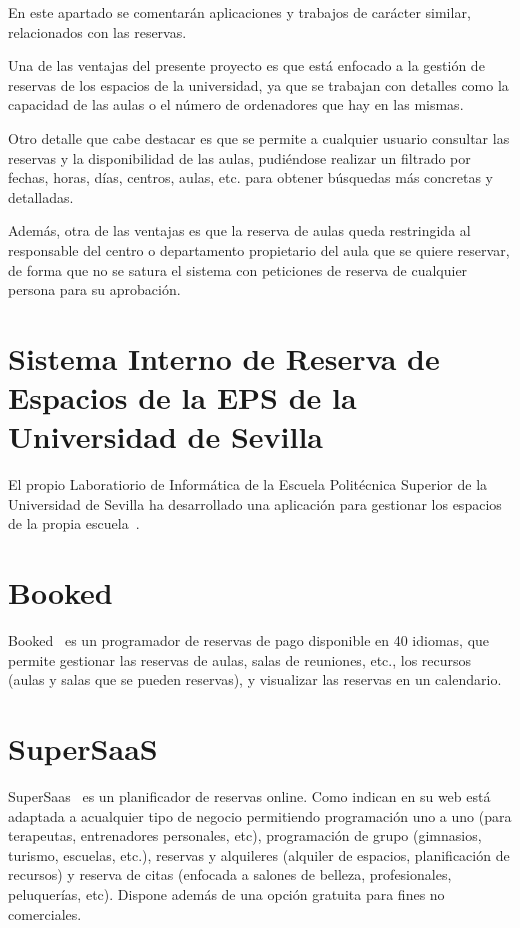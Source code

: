 En este apartado se comentarán aplicaciones y trabajos de carácter similar, relacionados con las reservas.

Una de las ventajas del presente proyecto es que está enfocado a la gestión de reservas de los espacios de la universidad, ya que se trabajan con detalles como la capacidad de las aulas o el número de ordenadores que hay en las mismas.

Otro detalle que cabe destacar es que se permite a cualquier usuario consultar las reservas y la disponibilidad de las aulas, pudiéndose realizar un filtrado por fechas, horas, días, centros, aulas, etc. para obtener búsquedas más concretas y detalladas.

Además, otra de las ventajas es que la reserva de aulas queda restringida al responsable del centro o departamento propietario del aula que se quiere reservar, de forma que no se satura el sistema con peticiones de reserva de cualquier persona para su aprobación.

\section{Sistema Interno de Reserva de Espacios de la EPS de la Universidad de Sevilla}
El propio Laboratiorio de Informática de la Escuela Politécnica Superior de la Universidad de Sevilla ha desarrollado una aplicación para gestionar los espacios de la propia escuela~\cite{pagina_eps_sevilla}.

\section{Booked}
Booked~\cite{pagina_booked} es un programador de reservas de pago disponible en 40 idiomas, que permite gestionar las reservas de aulas, salas de reuniones, etc., los recursos (aulas y salas que se pueden reservas), y visualizar las reservas en un calendario.

\section{SuperSaaS}
SuperSaas~\cite{pagina_supersaas} es un planificador de reservas online. Como indican en su web está adaptada a acualquier tipo de negocio permitiendo programación uno a uno (para terapeutas, entrenadores personales, etc), programación de grupo (gimnasios, turismo, escuelas, etc.), reservas y alquileres (alquiler de espacios, planificación de recursos) y reserva de citas (enfocada a salones de belleza, profesionales, peluquerías, etc). Dispone además de una opción gratuita para fines no comerciales.


